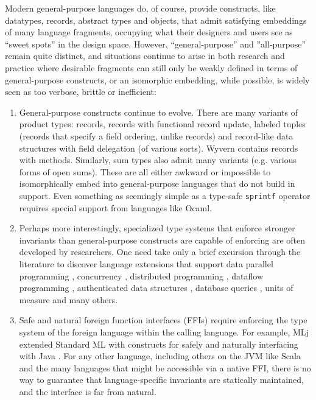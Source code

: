 Modern general-purpose languages do, of course, provide constructs, like datatypes, records, abstract types and objects, that admit satisfying embeddings of many language fragments, occupying what their designers and users see as ``sweet spots'' in the design space. However, ``general-purpose'' and ''all-purpose'' remain quite distinct, and situations continue to arise in both research and practice where desirable fragments can still only be weakly defined in terms of general-purpose constructs, or an isomorphic embedding, while possible, is widely seen as too verbose, brittle or inefficient:

\begin{enumerate}
\item General-purpose constructs continue to evolve. There are many  variants of product types: records, records with functional record update, labeled tuples (records that specify a field ordering, unlike records) and record-like data structures with field delegation (of various sorts). Wyvern contains records with methods. Similarly, sum types also admit many variants (e.g. various forms of open sums). These are all either awkward or impossible to isomorphically embed into general-purpose languages that do not build in support. Even something as seemingly simple as a type-safe \verb|sprintf| operator requires special support from languages like Ocaml.
\item Perhaps more interestingly, specialized type systems that enforce stronger invariants than general-purpose constructs are capable of enforcing are often developed by researchers. One need take only a brief  excursion through the literature to discover language extensions that support data parallel programming \cite{Blelloch93,chakravarty2007data}, concurrency \cite{reppy1993concurrent}, distributed programming \cite{Murphy:2007:TDP:1793574.1793585}, dataflow programming \cite{mandel2005reactiveml}, authenticated data structures \cite{Miller:2014:ADS:2535838.2535851}, database queries \cite{Ohori:2011:MSM:2034773.2034815},  units of measure \cite{conf/cefp/Kennedy09} and many others.%
\item Safe and natural foreign function interfaces (FFIs) require enforcing the type system of the foreign language within the calling language. %
For example, MLj extended Standard ML with constructs for safely and naturally interfacing with Java \cite{benton1999interlanguage}. For any other language, including  others on the JVM like Scala and the many languages that might be accessible via a native FFI, there is no way to guarantee that language-specific invariants are statically maintained, and the interface is far from natural.
\end{enumerate}


